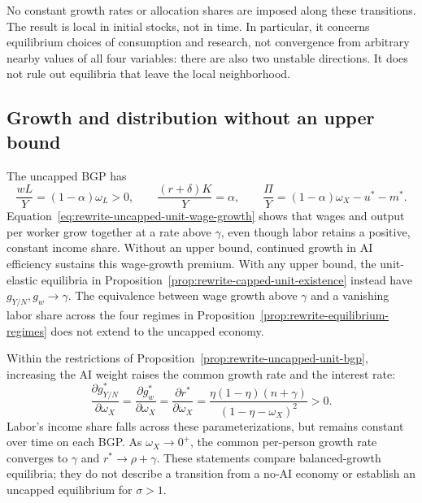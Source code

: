 No constant growth rates or allocation shares are imposed along these
transitions. The result is local in initial stocks, not in time. In particular,
it concerns equilibrium choices of consumption and research, not convergence
from arbitrary nearby values of all four variables: there are also two
unstable directions. It does not rule out equilibria that leave the local
neighborhood.

\subsection{Growth and distribution without an upper bound}

The uncapped BGP has
\begin{equation}
 \frac{wL}{Y}=(1-\alpha)\omega_L>0,\qquad
 \frac{(r+\delta)K}{Y}=\alpha,\qquad
 \frac{\Pi}{Y}=(1-\alpha)\omega_X-u^*-m^*.
 \label{eq:rewrite-uncapped-unit-distribution}
\end{equation}
Equation~\eqref{eq:rewrite-uncapped-unit-wage-growth} shows that wages
and output per worker grow together at a rate above $\gamma$, even though
labor retains a positive, constant income share. Without an upper bound,
continued growth in AI efficiency sustains this wage-growth premium.
With any upper bound, the unit-elastic equilibria in
Proposition~\ref{prop:rewrite-capped-unit-existence} instead have
$g_{Y/N},g_w\to\gamma$. The equivalence between wage growth above
$\gamma$ and a vanishing labor share across the four regimes in
Proposition~\ref{prop:rewrite-equilibrium-regimes} does not extend to the uncapped economy.

Within the restrictions of Proposition~\ref{prop:rewrite-uncapped-unit-bgp},
increasing the AI weight raises the common growth rate and the interest rate:
\begin{equation}
 \frac{\partial g_{Y/N}^*}{\partial\omega_X}
 =\frac{\partial g_w^*}{\partial\omega_X}
 =\frac{\partial r^*}{\partial\omega_X}
 =\frac{\eta(1-\eta)(n+\gamma)}{(1-\eta-\omega_X)^2}>0.
 \label{eq:rewrite-uncapped-unit-comparative-statics}
\end{equation}
Labor's income share falls across these parameterizations, but remains
constant over time on each BGP. As $\omega_X\to0^+$, the common per-person
growth rate converges to $\gamma$ and $r^*\to\rho+\gamma$. These statements
compare balanced-growth equilibria; they do not describe a transition
from a no-AI economy or establish an uncapped equilibrium for $\sigma>1$.
